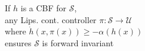 \documentclass[preview]{standalone}
\begin{document}
\begin{center}
If $h$ is a CBF for $\mathcal{S}$,\\any Lips. cont. controller $\pi : \mathcal{S} \to \mathcal{U}$\\ where $\dot h(x, \pi(x)) \geq -\alpha(h(x))$\\ensures $\mathcal{S}$ is forward invariant
\end{center}
\end{document}
